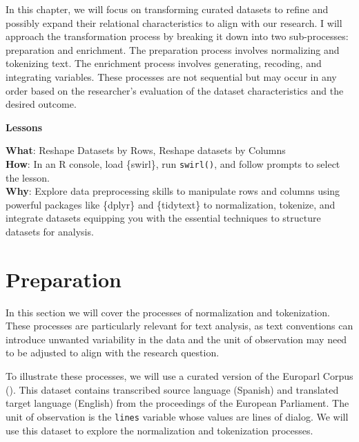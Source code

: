 \documentclass[
  letterpaper,
  krantz1]{latex/krantz-mod}
\theoremstyle{definition}
\theoremstyle{definition}
\theoremstyle{remark}
\begin{document}
In this chapter, we will focus on transforming curated datasets to
refine and possibly expand their relational characteristics to align
with our research. I will approach the transformation process by
breaking it down into two sub-processes: preparation and enrichment. The
preparation process involves normalizing and tokenizing text. The
enrichment process involves generating, recoding, and integrating
variables. These processes are not sequential but may occur in any order
based on the researcher's evaluation of the dataset characteristics and
the desired outcome.

\begin{tcolorbox}[enhanced jigsaw, leftrule=.75mm, colframe=quarto-callout-color-frame, left=2mm, colback=white, toprule=.15mm, breakable, arc=.35mm, opacityback=0, bottomrule=.15mm, rightrule=.15mm]

\textbf{ Lessons}

\textbf{What}: Reshape Datasets by Rows, Reshape datasets by Columns\\
\textbf{How}: In an R console, load \{swirl\}, run \texttt{swirl()}, and
follow prompts to select the lesson.\\
\textbf{Why}: Explore data preprocessing skills to manipulate rows and
columns using powerful packages like \{dplyr\} and \{tidytext\} to
normalization, tokenize, and integrate datasets equipping you with the
essential techniques to structure datasets for analysis.

\end{tcolorbox}

\section{Preparation}\label{sec-transform-preparation}

In this section we will cover the processes of normalization and
tokenization. These processes are particularly relevant for text
analysis, as text conventions can introduce unwanted variability in the
data and the unit of observation may need to be adjusted to align with
the research question.

To illustrate these processes, we will use a curated version of the
Europarl Corpus (). This dataset
contains transcribed source language (Spanish) and translated target
language (English) from the proceedings of the European Parliament. The
unit of observation is the \texttt{lines} variable whose values are
lines of dialog. We will use this dataset to explore the normalization
and tokenization processes.
\end{document}
